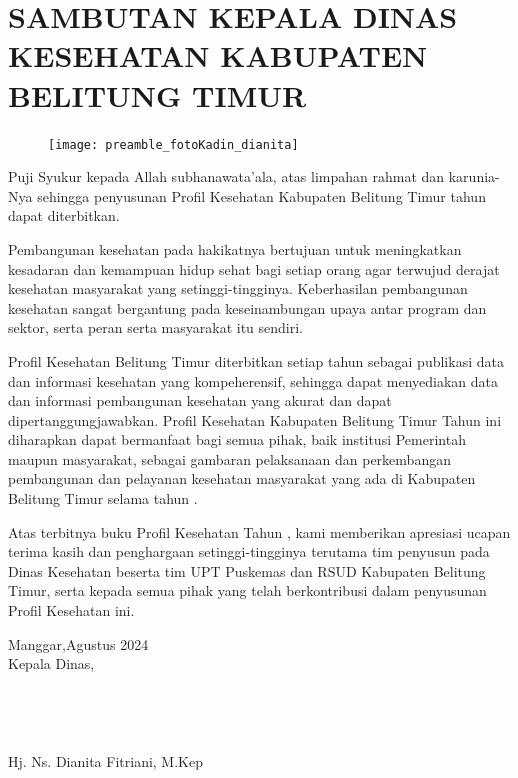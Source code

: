 {}
\section*{SAMBUTAN KEPALA DINAS KESEHATAN KABUPATEN BELITUNG TIMUR}
\begingroup
\setlength\intextsep{0pt}
\begin{figure}
    \centering
    \texttt{[image: preamble\_fotoKadin\_dianita]}
\end{figure}

Puji Syukur kepada Allah subhanawata'ala, atas limpahan rahmat dan  karunia-Nya sehingga penyusunan Profil Kesehatan Kabupaten Belitung Timur tahun \tPnos{} dapat diterbitkan.

Pembangunan kesehatan pada hakikatnya bertujuan untuk meningkatkan kesadaran dan kemampuan hidup sehat bagi setiap orang agar terwujud derajat kesehatan masyarakat yang setinggi-tingginya. Keberhasilan pembangunan kesehatan sangat bergantung pada keseinambungan upaya antar program dan sektor, serta peran serta masyarakat itu sendiri.

Profil Kesehatan Belitung Timur diterbitkan setiap tahun sebagai publikasi data dan informasi kesehatan yang kompeherensif, sehingga dapat menyediakan data dan informasi pembangunan kesehatan yang akurat dan dapat dipertanggungjawabkan. Profil Kesehatan Kabupaten Belitung Timur Tahun \tPnos{} ini diharapkan dapat bermanfaat bagi semua pihak, baik institusi Pemerintah maupun masyarakat, sebagai gambaran pelaksanaan dan perkembangan pembangunan dan pelayanan kesehatan masyarakat yang ada di Kabupaten Belitung Timur selama tahun \tPnos{}. 

\endgroup

Atas terbitnya buku Profil Kesehatan Tahun \tPnos{}, kami memberikan apresiasi ucapan terima kasih dan penghargaan setinggi-tingginya terutama tim penyusun pada Dinas Kesehatan beserta tim UPT Puskemas dan RSUD Kabupaten Belitung Timur, serta kepada semua pihak yang telah berkontribusi dalam penyusunan Profil Kesehatan \tPnos{} ini.


\vspace*{4ex}
\noindent Manggar,\hspace{3em}Agustus 2024\\
Kepala Dinas,\\
\\
\\
\\
\\
Hj. Ns. Dianita Fitriani, M.Kep\\


